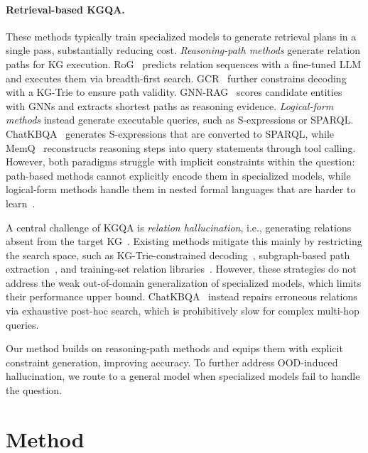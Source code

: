 \documentclass[11pt]{article}
\begin{document}
\paragraph{Retrieval-based KGQA.}
These methods typically train specialized models to generate retrieval plans in a single pass, substantially reducing cost. \emph{Reasoning-path methods} generate relation paths for KG execution. RoG~\citep{luo2024rog} predicts relation sequences with a fine-tuned LLM and executes them via breadth-first search. GCR~\citep{pmlr-v267-luo25t} further constrains decoding with a KG-Trie to ensure path validity. GNN-RAG~\citep{mavromatis-karypis-2025-gnn} scores candidate entities with GNNs and extracts shortest paths as reasoning evidence. \emph{Logical-form methods} instead generate executable queries, such as S-expressions or SPARQL. ChatKBQA~\citep{luo-etal-2024-chatkbqa} generates S-expressions that are converted to SPARQL, while MemQ~\citep{xu-etal-2025-memory} reconstructs reasoning steps into query statements through tool calling. However, both paradigms struggle with implicit constraints within the question: path-based methods cannot explicitly encode them in specialized models, while logical-form methods handle them in nested formal languages that are harder to learn~\citep{tian-etal-2025-compkbqa}.

A central challenge of KGQA is \emph{relation hallucination}, i.e., generating relations absent from the target KG~\citep{tian-etal-2025-compkbqa}. Existing methods mitigate this mainly by restricting the search space, such as KG-Trie-constrained decoding~\citep{pmlr-v267-luo25t}, subgraph-based path extraction~\citep{mavromatis-karypis-2025-gnn}, and training-set relation libraries~\citep{xu-etal-2025-memory}. However, these strategies do not address the weak out-of-domain generalization of specialized models, which limits their performance upper bound. ChatKBQA~\citep{luo-etal-2024-chatkbqa} instead repairs erroneous relations via exhaustive post-hoc search, which is prohibitively slow for complex multi-hop queries.

Our method builds on reasoning-path methods and equips them with explicit constraint generation, improving accuracy. To further address OOD-induced hallucination, we route to a general model when specialized models fail to handle the question.


\section{Method}
\label{sec:method}
\end{document}
